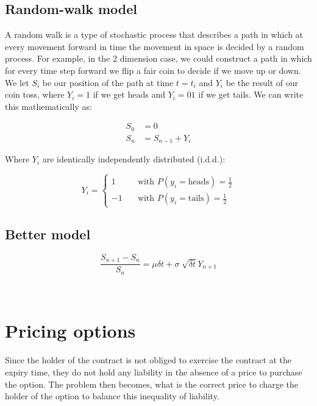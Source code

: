 \subsection{Random-walk model}

A random walk is a type of stochastic process that describes a path in which at every movement forward in time the movement in space is decided by a random process. For example, in the 2 dimension case, we could construct a path in which for every time step forward we flip a fair coin to decide if we move up or down. We let \( S_i \) be our position of the path at time \(t = t_i\) and \(Y_i\) be the result of our coin toss, where \(Y_i = 1\) if we get heads and \(Y_i = 01\) if we get tails. We can write this mathematically as:

\begin{align*}
    S_0 &= 0 \\
    S_n &= S_{n-1} + Y_i
\end{align*}

Where \(Y_i\) are identically independently distributed (i.d.d.):

\begin{equation*}
    Y_i = 
    \begin{cases}
       1& \quad \text{with } P(y_i = \text{heads}) = \frac{1}{2} \\
       -1& \quad \text{with } P(y_i = \text{tails}) = \frac{1}{2}
    \end{cases}
\end{equation*}

\subsection{Better model}

\begin{equation}
    \frac{S_{n+1} - S_n}{S_n} = \mu\delta t + \sigma\sqrt[]{\delta t}Y_{n+1}
\end{equation}

\

\section{Pricing options}

Since the holder of the contract is not obliged to exercise the contract at the expiry time, they do not hold any liability in the absence of a price to purchase the option. The problem then becomes, what is the correct price to charge the holder of the option to balance this inequality of liability.



